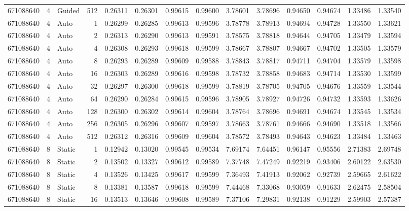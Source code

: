 \begin{tabular}{rrlrrrrrrrrrrr}
671088640 & 4 & Guided & 512 & 0.26311 & 0.26301 & 0.99615 & 0.99600 & 3.78601 & 3.78696 & 0.94650 & 0.94674 & 1.33486 & 1.33540 \\
671088640 & 4 & Auto & 1 & 0.26299 & 0.26285 & 0.99613 & 0.99596 & 3.78778 & 3.78913 & 0.94694 & 0.94728 & 1.33550 & 1.33621 \\
671088640 & 4 & Auto & 2 & 0.26313 & 0.26290 & 0.99613 & 0.99591 & 3.78575 & 3.78818 & 0.94644 & 0.94705 & 1.33479 & 1.33594 \\
671088640 & 4 & Auto & 4 & 0.26308 & 0.26293 & 0.99618 & 0.99599 & 3.78667 & 3.78807 & 0.94667 & 0.94702 & 1.33505 & 1.33579 \\
671088640 & 4 & Auto & 8 & 0.26293 & 0.26289 & 0.99609 & 0.99588 & 3.78843 & 3.78817 & 0.94711 & 0.94704 & 1.33579 & 1.33598 \\
671088640 & 4 & Auto & 16 & 0.26303 & 0.26289 & 0.99616 & 0.99598 & 3.78732 & 3.78858 & 0.94683 & 0.94714 & 1.33530 & 1.33599 \\
671088640 & 4 & Auto & 32 & 0.26297 & 0.26300 & 0.99618 & 0.99599 & 3.78819 & 3.78705 & 0.94705 & 0.94676 & 1.33559 & 1.33544 \\
671088640 & 4 & Auto & 64 & 0.26290 & 0.26284 & 0.99615 & 0.99596 & 3.78905 & 3.78927 & 0.94726 & 0.94732 & 1.33593 & 1.33626 \\
671088640 & 4 & Auto & 128 & 0.26300 & 0.26302 & 0.99614 & 0.99604 & 3.78764 & 3.78696 & 0.94691 & 0.94674 & 1.33545 & 1.33534 \\
671088640 & 4 & Auto & 256 & 0.26305 & 0.26296 & 0.99607 & 0.99597 & 3.78663 & 3.78761 & 0.94666 & 0.94690 & 1.33518 & 1.33566 \\
671088640 & 4 & Auto & 512 & 0.26312 & 0.26316 & 0.99609 & 0.99604 & 3.78572 & 3.78493 & 0.94643 & 0.94623 & 1.33484 & 1.33463 \\
671088640 & 8 & Static & 1 & 0.12942 & 0.13020 & 0.99545 & 0.99534 & 7.69174 & 7.64451 & 0.96147 & 0.95556 & 2.71383 & 2.69748 \\
671088640 & 8 & Static & 2 & 0.13502 & 0.13327 & 0.99612 & 0.99589 & 7.37748 & 7.47249 & 0.92219 & 0.93406 & 2.60122 & 2.63530 \\
671088640 & 8 & Static & 4 & 0.13526 & 0.13425 & 0.99617 & 0.99599 & 7.36493 & 7.41913 & 0.92062 & 0.92739 & 2.59665 & 2.61622 \\
671088640 & 8 & Static & 8 & 0.13381 & 0.13587 & 0.99618 & 0.99599 & 7.44468 & 7.33068 & 0.93059 & 0.91633 & 2.62475 & 2.58504 \\
671088640 & 8 & Static & 16 & 0.13513 & 0.13646 & 0.99608 & 0.99589 & 7.37106 & 7.29831 & 0.92138 & 0.91229 & 2.59903 & 2.57387 \\

\end{tabular}
